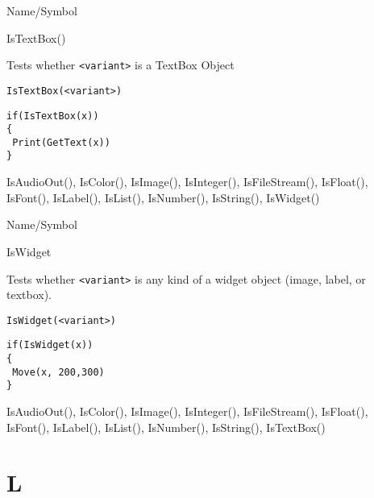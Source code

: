 \begin{desc}{Name/Symbol}
\item[Name/Symbol]	IsTextBox()

\item[Description]	Tests whether \verb+<variant>+ is a TextBox Object

\item[Usage]
\begin{verbatim}
IsTextBox(<variant>)
\end{verbatim}

\item[Example]	
\begin{verbatim}
if(IsTextBox(x))
{
 Print(GetText(x))
}
\end{verbatim}

\item[See Also]	IsAudioOut(), IsColor(), IsImage(), IsInteger(), 
		IsFileStream(), IsFloat(), IsFont(), IsLabel(),
 		IsList(), IsNumber(), IsString(),  IsWidget()
\end{desc}

\rl


\begin{desc}{Name/Symbol}
\item[Name/Symbol]	IsWidget

\item[Description]	Tests whether \verb+<variant>+ is any kind of a widget object
		(image, label, or textbox).

\item[Usage]		
\begin{verbatim}
IsWidget(<variant>)
\end{verbatim}

\item[Example]	
\begin{verbatim}
if(IsWidget(x))
{
 Move(x, 200,300)
}
\end{verbatim}

\item[See Also]	IsAudioOut(), IsColor(), IsImage(), IsInteger(), 
            	IsFileStream(), IsFloat(), IsFont(), IsLabel(),
 	   	IsList(), IsNumber(), IsString(), IsTextBox()
\end{desc}

\rl

\section{L}
\rl

